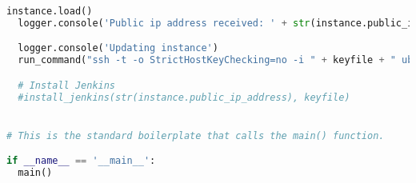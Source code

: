 \begin{lstlisting}[language=python]
  instance.load()
  logger.console('Public ip address received: ' + str(instance.public_ip_address))

  logger.console('Updating instance')
  run_command("ssh -t -o StrictHostKeyChecking=no -i " + keyfile + " ubuntu@" + str(instance.public_ip_address) + " 'sudo apt -y update'")

  # Install Jenkins
  #install_jenkins(str(instance.public_ip_address), keyfile)


# This is the standard boilerplate that calls the main() function.

if __name__ == '__main__':
  main()
  
\end{lstlisting}
